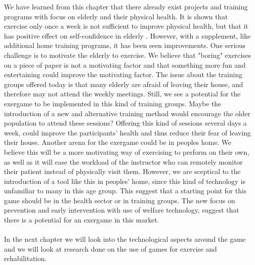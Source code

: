 We have learned from this chapter that there already exist projects and training programs with focus on elderly and their physical health. It is shown that exercise only once a week is not sufficient to improve physical health, but that it has positive effect on self-confidence in elderly \cite{gruppetrening-trheim}.  However, with a supplement, like additional home training programs, it has been seen improvements. One serious challenge is to motivate the elderly to exercise. We believe that "boring" exercises on a piece of paper is not a motivating factor and that something more fun and entertaining could improve the motivating factor. The issue about the training groups offered today is that many elderly are afraid of leaving their house, and therefore may not attend the weekly meetings. Still, we see a potential for the exergame to be implemented in this kind of training groups. Maybe the introduction of a new and alternative training method would encourage the older population to attend these sessions? Offering this kind of sessions several days a week, could improve the participants' health and thus reduce their fear of leaving their house.  Another arena for the exergame could be in peoples home. We believe this will be a more motivating way of exercising to perform on their own, as well as it will ease the workload of the instructor who can remotely monitor their patient instead of physically visit them. However, we are sceptical to the introduction of a tool like this in peoples' home, since this kind of technology is unfamiliar to many in this age group. This suggest that a starting point for this game should be in the health sector or in training groups.  The new focus on prevention and early intervention with use of welfare technology, suggest that there is a potential for an exergame in this market. \\ \\
In the next chapter we will look into the technological aspects around the game and we will look at research done on the use of games for exercise and rehabilitation.

